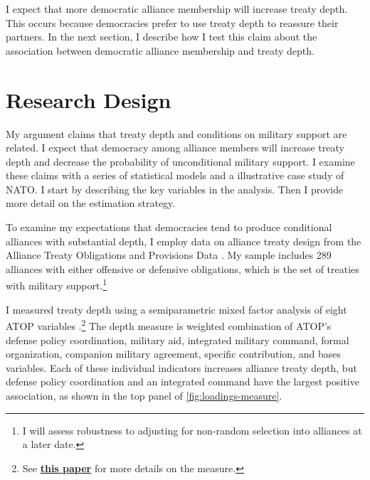\documentclass[12pt]{article}
\begin{document}
I expect that more democratic alliance membership will increase treaty depth. 
This occurs because democracies prefer to use treaty depth to reassure their partners. 
In the next section, I describe how I test this claim about the association between democratic alliance membership and treaty depth. 




\section{Research Design}


My argument claims that treaty depth and conditions on military support are related. 
I expect that democracy among alliance members will increase treaty depth and decrease the probability of unconditional military support. 
I examine these claims with a series of statistical models and a illustrative case study of NATO. 
I start by describing the key variables in the analysis. 
Then I provide more detail on the estimation strategy. 


To examine my expectations that democracies tend to produce conditional alliances with substantial depth, I employ data on alliance treaty design from the Alliance Treaty Obligations and Provisions Data \citep{Leedsetal2002}. 
My sample includes 289 alliances with either offensive or defensive obligations, which is the set of treaties with military support.\footnote{I will assess robustness to adjusting for non-random selection into alliances at a later date.} 


I measured treaty depth using a semiparametric mixed factor analysis of eight ATOP variables \citep{Murrayetal2013}.\footnote{See \textbf{\href{https://github.com/joshuaalley/arms-allies/blob/master/manuscript/arms-allies-paper.pdf}{this paper}} for more details on the measure.}
The depth measure is weighted combination of ATOP's defense policy coordination, military aid, integrated military command, formal organization, companion military agreement, specific contribution, and bases variables. 
Each of these individual indicators increases alliance treaty depth, but defense policy coordination and an integrated command have the largest positive association, as shown in the top panel of \autoref{fig:loadings-measure}. 
\end{document}
